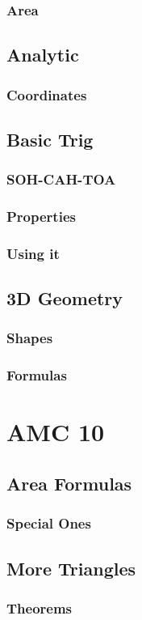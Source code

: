 \documentclass[11pt]{article}
\begin{document}
\subsubsection*{Area}
\subsection{Analytic}
\subsubsection*{Coordinates}
\subsection{Basic Trig}
\subsubsection*{SOH-CAH-TOA}
\subsubsection*{Properties}
\subsubsection*{Using it}
\subsection{3D Geometry}
\subsubsection*{Shapes}
\subsubsection*{Formulas}
\section{AMC 10}
\subsection{Area Formulas}
\subsubsection*{Special Ones}
\subsection{More Triangles}
\subsubsection*{Theorems}
\end{document}
